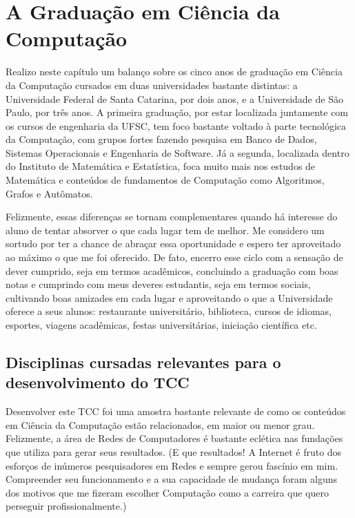 \chapter{A Graduação em Ciência da Computação}
\label{cap:a_graduacao}
Realizo neste capítulo um balanço sobre os cinco anos de graduação em Ciência
da Computação cursados em duas universidades bastante distintas: a 
Universidade Federal de Santa Catarina, por dois anos, e a Universidade de São
Paulo, por três anos. A primeira graduação, por estar localizada juntamente
com os cursos de engenharia da UFSC, tem foco bastante voltado à parte
tecnológica da Computação, com grupos fortes fazendo pesquisa em Banco de Dados,
Sistemas Operacionais e Engenharia de Software. Já a segunda, localizada dentro
do Instituto de Matemática e Estatística, foca muito mais nos estudos de 
Matemática e conteúdos de fundamentos de Computação como Algoritmos, Grafos e 
Autômatos. 

Felizmente, essas diferenças se tornam complementares quando há interesse 
do aluno de tentar absorver o que cada lugar tem de melhor. Me considero um
sortudo por ter a chance de abraçar essa oportunidade e espero ter aproveitado
ao máximo o que me foi oferecido. De fato, encerro esse ciclo com a sensação de
dever cumprido, seja em termos acadêmicos, concluindo a graduação com boas notas
e cumprindo com meus deveres estudantis, seja em termos sociais, cultivando 
boas amizades em cada lugar e aproveitando o que a Universidade oferece a seus
alunos: restaurante universitário, biblioteca, cursos de idiomas, esportes,
viagens acadêmicas, festas universitárias, iniciação científica etc.

\section{Disciplinas cursadas relevantes para o desenvolvimento do TCC}
\label{sec:disciplinas_relevantes}
Desenvolver este TCC foi uma amostra bastante relevante de como os conteúdos em
Ciência da Computação estão relacionados, em maior ou menor grau. Felizmente, 
a área de Redes de Computadores é bastante eclética nas fundações que utiliza
para gerar seus resultados. (E que resultados! A Internet é fruto dos esforços
de inúmeros pesquisadores em Redes e sempre gerou fascínio em mim. Compreender
seu funcionamento e a sua capacidade de mudança foram alguns dos motivos que 
me fizeram escolher Computação como a carreira que quero perseguir
profissionalmente.)

